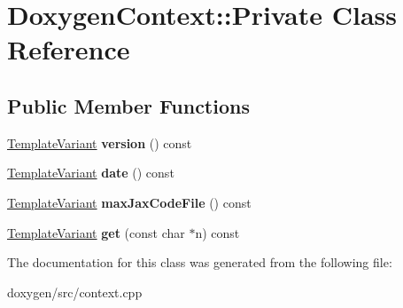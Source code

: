 \hypertarget{class_doxygen_context_1_1_private}{}\section{Doxygen\+Context\+::Private Class Reference}
\label{class_doxygen_context_1_1_private}
\subsection*{Public Member Functions}
\begin{DoxyCompactItemize}
\item 
\mbox{\label{class_doxygen_context_1_1_private_ad0df09a591895c8089af62c5dbc9480e}} 
\mbox{\hyperlink{class_template_variant}{Template\+Variant}} {\bfseries version} () const
\item 
\mbox{\label{class_doxygen_context_1_1_private_af60d73c41298cf881d4b9126019ae918}} 
\mbox{\hyperlink{class_template_variant}{Template\+Variant}} {\bfseries date} () const
\item 
\mbox{\label{class_doxygen_context_1_1_private_ac090845e60e8ec9d10c1fffd3b43bc1d}} 
\mbox{\hyperlink{class_template_variant}{Template\+Variant}} {\bfseries max\+Jax\+Code\+File} () const
\item 
\mbox{\label{class_doxygen_context_1_1_private_ae0a54ba34a9528665765031cd6890d6b}} 
\mbox{\hyperlink{class_template_variant}{Template\+Variant}} {\bfseries get} (const char $\ast$n) const
\end{DoxyCompactItemize}


The documentation for this class was generated from the following file\+:\begin{DoxyCompactItemize}
\item 
doxygen/src/context.\+cpp\end{DoxyCompactItemize}
